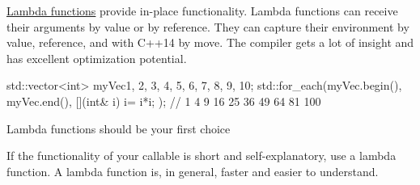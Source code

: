 \href{http://en.cppreference.com/w/cpp/language/lambda}{Lambda functions} provide in-place functionality. Lambda functions can receive their arguments by value or by reference. They can capture their environment by value, reference, and with C++14 by move. The compiler gets a lot of insight and has excellent optimization potential.

\begin{cpp}
std::vector<int> myVec{1, 2, 3, 4, 5, 6, 7, 8, 9, 10};
std::for_each(myVec.begin(), myVec.end(), [](int& i){ i= i*i; });
									// 1 4 9 16 25 36 49 64 81 100
\end{cpp}

\begin{myTip}{Lambda functions should be your first choice}
	
If the functionality of your callable is short and self-explanatory, use a lambda function. A lambda function is, in general, faster and easier to understand.
\end{myTip}












